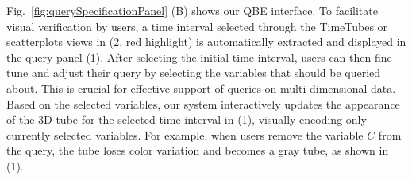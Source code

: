 Fig.~\ref{fig:querySpecificationPanel} (B) shows our QBE interface.
To facilitate visual verification by users, a time interval selected through the TimeTubes or scatterplots views in (2, red highlight) is automatically extracted and displayed in the query panel (1).
After selecting the initial time interval, users can then fine-tune and adjust their query by selecting the variables that should be queried about. 
This is crucial for effective support of queries on multi-dimensional data.
Based on the selected variables, 
our system interactively updates the appearance of the 3D tube for the selected time interval in (1), visually encoding only currently selected variables.
For example, when users remove the variable $C$ from the query, the tube loses color variation and becomes a gray tube, as shown in (1).
